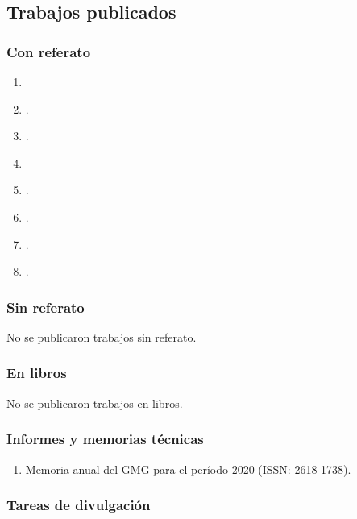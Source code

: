 \documentclass[a4paper,11pt,twoside,final,titlepage,onecolumn,openright]{report}
\begin{document}
\subsection{Trabajos publicados}

\subsubsection{Con referato}

% 


\begin{enumerate}
    \item {}
    \item {}.
    \item {}.
    \item {}
    \item {}.
    \item {}.
    \item {}.
    \item {}.
\end{enumerate}

\subsubsection{Sin referato}
No se publicaron trabajos sin referato.

\subsubsection{En libros}

No se publicaron trabajos en libros.

\subsubsection{Informes y memorias técnicas}
\begin{enumerate}
 \item Memoria anual del GMG para el período 2020 (ISSN: 2618-1738).
\end{enumerate}


\subsubsection{Tareas de divulgación}
\end{document}
